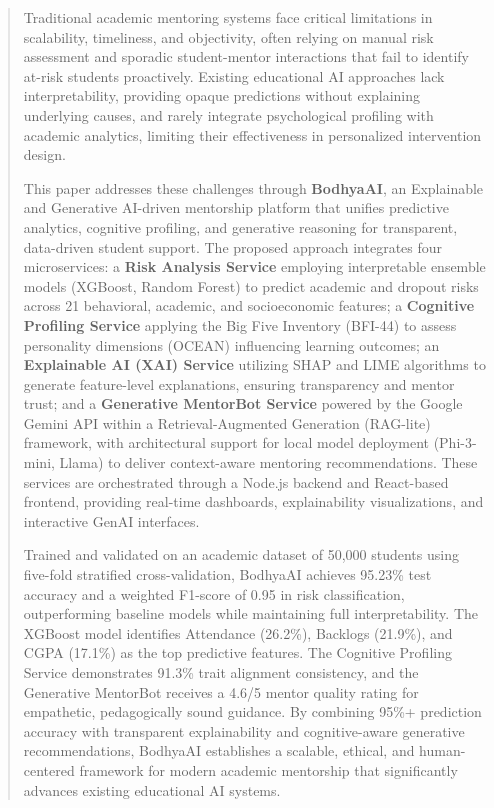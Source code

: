 \documentclass[conference]{IEEEtran}
\begin{document}
\begin{abstract}
Traditional academic mentoring systems face critical limitations in scalability, timeliness, and objectivity, often relying on manual risk assessment and sporadic student-mentor interactions that fail to identify at-risk students proactively. Existing educational AI approaches lack interpretability, providing opaque predictions without explaining underlying causes, and rarely integrate psychological profiling with academic analytics, limiting their effectiveness in personalized intervention design.

This paper addresses these challenges through \textbf{BodhyaAI}, an Explainable and Generative AI-driven mentorship platform that unifies predictive analytics, cognitive profiling, and generative reasoning for transparent, data-driven student support. The proposed approach integrates four microservices: a \textbf{Risk Analysis Service} employing interpretable ensemble models (XGBoost, Random Forest) to predict academic and dropout risks across 21 behavioral, academic, and socioeconomic features; a \textbf{Cognitive Profiling Service} applying the Big Five Inventory (BFI-44) to assess personality dimensions (OCEAN) influencing learning outcomes; an \textbf{Explainable AI (XAI) Service} utilizing SHAP and LIME algorithms to generate feature-level explanations, ensuring transparency and mentor trust; and a \textbf{Generative MentorBot Service} powered by the Google Gemini API within a Retrieval-Augmented Generation (RAG-lite) framework, with architectural support for local model deployment (Phi-3-mini, Llama) to deliver context-aware mentoring recommendations. These services are orchestrated through a Node.js backend and React-based frontend, providing real-time dashboards, explainability visualizations, and interactive GenAI interfaces.

Trained and validated on an academic dataset of 50,000 students using five-fold stratified cross-validation, BodhyaAI achieves 95.23\% test accuracy and a weighted F1-score of 0.95 in risk classification, outperforming baseline models while maintaining full interpretability. The XGBoost model identifies Attendance (26.2\%), Backlogs (21.9\%), and CGPA (17.1\%) as the top predictive features. The Cognitive Profiling Service demonstrates 91.3\% trait alignment consistency, and the Generative MentorBot receives a 4.6/5 mentor quality rating for empathetic, pedagogically sound guidance. By combining 95\%+ prediction accuracy with transparent explainability and cognitive-aware generative recommendations, BodhyaAI establishes a scalable, ethical, and human-centered framework for modern academic mentorship that significantly advances existing educational AI systems.
\end{abstract}
\end{document}
